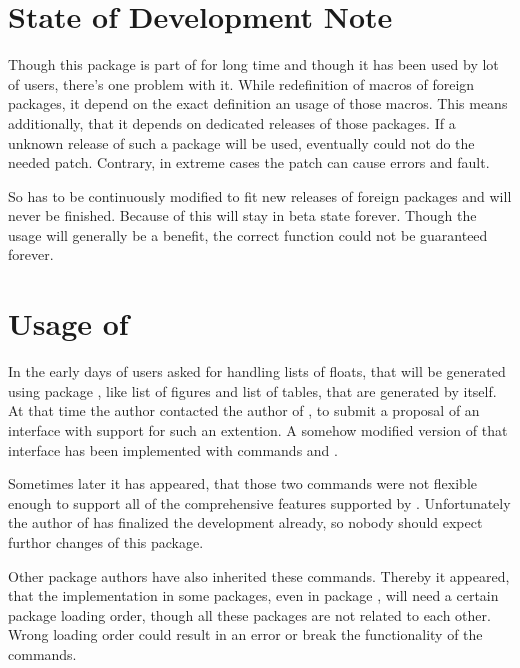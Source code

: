\section{State of Development Note}
\label{scr:scrhack.draft}

Though this package is part of \KOMAScript{} for long time and though it has
been used by lot of users, there's one problem with it. While redefinition of
macros of foreign packages, it depend on the exact definition an usage of
those macros. This means additionally, that it depends on dedicated releases
of those packages. If a unknown release of such a package will be used,
 eventually could not do the needed patch. Contrary, in
extreme cases the patch can cause errors and fault.

So  has to be continuously modified to fit new releases of
foreign packages and will never be finished. Because of this 
will stay in beta state forever. Though the usage will generally be a
benefit, the correct function could not be guaranteed forever.


\section{Usage of }

In the early days of \KOMAScript{} users asked for handling lists of floats,
that will be generated using package
, like list of
figures and list of tables, that are generated by \KOMAScript{} itself. At
that time the \KOMAScript{} author contacted the author of , to
submit a proposal of an interface with support for such an extention. A
somehow modified version of that interface has been implemented with commands
 and
.

Sometimes later it has appeared, that those two commands were not flexible
enough to support all of the comprehensive features supported by
\KOMAScript. Unfortunately the author of  has finalized the
development already, so nobody should expect furthor changes of this package.

Other package authors have also inherited these commands. Thereby it appeared,
that the implementation in some packages, even in package ,
will need a certain package loading order, though all these packages are not
related to each other. Wrong loading order could result in an error or break the
functionality of the commands.

